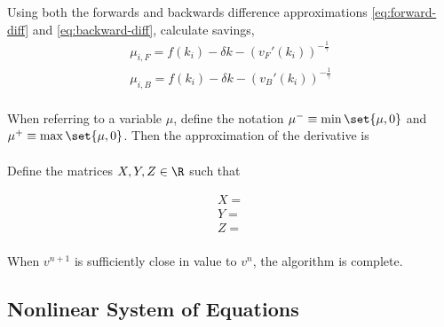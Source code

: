 \documentclass[11pt]{etk-article}
\begin{document}
Using both the forwards and backwards difference approximations \cref{eq:forward-diff} and \cref{eq:backward-diff}, calculate savings,
\begin{align}
\mu_{i,F} = f(k_i) - \delta k - \left(v_F'(k_i) \right)^{-\frac{1}{\gamma}}\\
\mu_{i,B} = f(k_i) - \delta k - \left(v_B'(k_i) \right)^{-\frac{1}{\gamma}}\\
\end{align}

When referring to a variable $\mu$, define the notation $\mu^{-} \equiv \min\set{\mu,0}$ and $\mu^{+} \equiv \max\set{\mu,0}$. Then the approximation of the derivative is 
\begin{align}
\end{align}


Define the matrices $X, Y, Z \in \R $ such that 

\begin{align}
	X = \\
	Y = \\
	Z = \\
\end{align}

When $v^{n+1}$ is sufficiently close in value to $v^n$, the algorithm is complete. 



\subsection{Nonlinear System of Equations}


\end{document}
